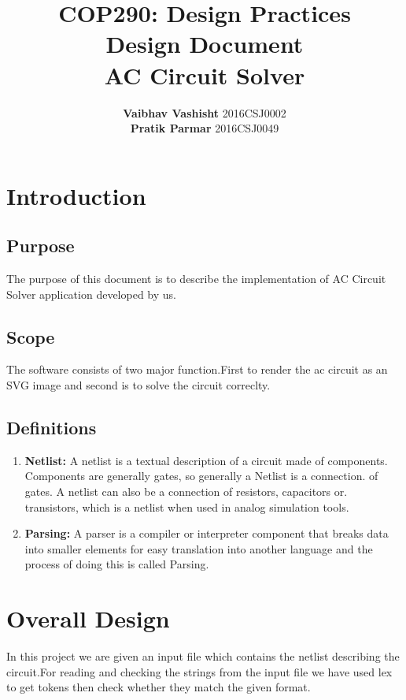 \documentclass[12pt]{extarticle}
\date{}
\author{\textbf{Vaibhav Vashisht} 2016CSJ0002  \\\textbf{Pratik Parmar} 2016CSJ0049}
\title{\textbf{COP290: Design Practices\\ Design Document \\ AC Circuit Solver  }}
\begin{document}
\maketitle
\newpage
\tableofcontents
\newpage
\section{Introduction}

\subsection{Purpose}
The purpose of this document is to describe the implementation of AC Circuit Solver application developed by us.
\subsection{Scope}
The software consists of two major function.First to render the ac circuit as an SVG image and second is to solve the circuit correclty.
\subsection{Definitions}
\begin{enumerate}
\item \textbf{Netlist:} A netlist is a textual description of a circuit made of components. Components are generally gates, so generally a Netlist is a connection. of gates. A netlist can also be a connection of resistors, capacitors or. transistors, which is a netlist when used in analog simulation tools. 
\item \textbf{Parsing: }A parser is a compiler or interpreter component that breaks data into smaller elements for easy translation into another language and the process of doing this is called Parsing. 
\end{enumerate}
\section{Overall Design}
In this project we are given an input file which contains the netlist describing the circuit.For reading and checking the strings
from the input file we have used lex to get tokens then check whether they match the given format.
\end{document}
